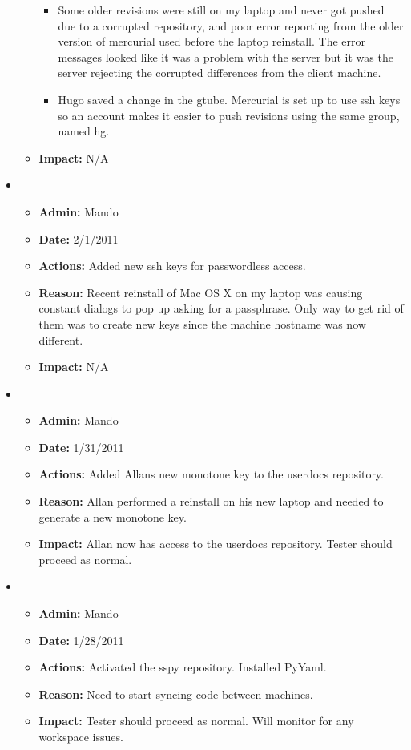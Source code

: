 \documentclass[12pt]{article}
\begin{document}
\begin{itemize}
\begin{itemize}
  \begin{itemize}
  \item[] Some older revisions were still on my laptop and never got pushed due to a corrupted repository, and poor error reporting from the older version of mercurial used before the laptop reinstall. The error messages looked like it was a problem with the server but it was the server rejecting the corrupted differences from the client machine. 
  \item[] Hugo saved a change in the gtube. Mercurial is set up to use ssh keys so an account makes it easier to push revisions using the same group, named hg.
  \end{itemize}

\item[] {\bf Impact:}  N/A
\end{itemize}

\item
\begin{itemize}
\item[] {\bf Admin:} Mando
\item[] {\bf Date:} 2/1/2011 
\item[] {\bf Actions:}  Added new ssh keys for passwordless access.
\item[] {\bf Reason:} Recent reinstall of Mac OS X on my laptop was causing constant dialogs to pop up asking for a passphrase. Only way to get rid of them was to create new keys since the machine hostname was now different.
\item[] {\bf Impact:}  N/A
\end{itemize}

\item
\begin{itemize}
\item[] {\bf Admin:} Mando
\item[] {\bf Date:} 1/31/2011 
\item[] {\bf Actions:}  Added Allans new monotone key to the userdocs repository.
\item[] {\bf Reason:} Allan performed a reinstall on his new laptop and needed to generate a new monotone key.
\item[] {\bf Impact:}  Allan now has access to the userdocs repository. Tester should proceed as normal. 
\end{itemize}

\item
\begin{itemize}
\item[] {\bf Admin:} Mando
\item[] {\bf Date:} 1/28/2011 
\item[] {\bf Actions:}  Activated the sspy repository. Installed PyYaml.
\item[] {\bf Reason:} Need to start syncing code between machines. 
\item[] {\bf Impact:}  Tester should proceed as normal. Will monitor for any workspace issues.
\end{itemize}



\end{itemize}
\end{document}
